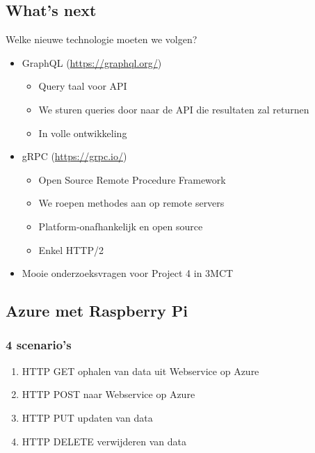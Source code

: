 \documentclass{article}
\begin{document}
\subsection{What's next}
Welke nieuwe technologie moeten we volgen?

\begin{itemize}
    \item GraphQL (\url{https://graphql.org/})
    \begin{itemize}
        \item Query taal voor API
        \item We sturen queries door naar de API die resultaten zal returnen
        \item In volle ontwikkeling
    \end{itemize}
    \item gRPC (\url{https://grpc.io/})
    \begin{itemize}
        \item Open Source Remote Procedure Framework
        \item We roepen methodes aan op remote servers
        \item Platform-onafhankelijk en open source
        \item Enkel HTTP/2
    \end{itemize}
    \item Mooie onderzoeksvragen voor Project 4 in 3MCT
\end{itemize}

\subsection{Azure met Raspberry Pi}
\subsubsection{4 scenario's}

\begin{enumerate}
    \item HTTP GET ophalen van data uit Webservice op Azure
    \item HTTP POST naar Webservice op Azure
    \item HTTP PUT updaten van data
    \item HTTP DELETE verwijderen van data
\end{enumerate}
\end{document}
